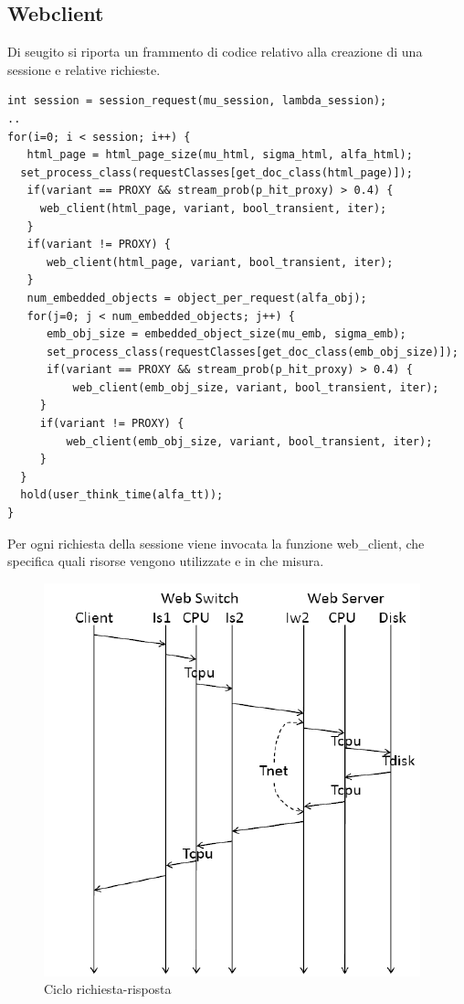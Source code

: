 \subsection{Webclient}
Di seugito si riporta un frammento di codice relativo alla creazione di una sessione e relative richieste. 
\begin{lstlisting}
int session = session_request(mu_session, lambda_session); 
..
for(i=0; i < session; i++) { 
   html_page = html_page_size(mu_html, sigma_html, alfa_html); 
  set_process_class(requestClasses[get_doc_class(html_page)]); 
   if(variant == PROXY && stream_prob(p_hit_proxy) > 0.4) { 
     web_client(html_page, variant, bool_transient, iter); 
   } 
   if(variant != PROXY) { 
      web_client(html_page, variant, bool_transient, iter); 
   } 
   num_embedded_objects = object_per_request(alfa_obj); 
   for(j=0; j < num_embedded_objects; j++) { 
      emb_obj_size = embedded_object_size(mu_emb, sigma_emb); 
      set_process_class(requestClasses[get_doc_class(emb_obj_size)]); 
      if(variant == PROXY && stream_prob(p_hit_proxy) > 0.4) { 
          web_client(emb_obj_size, variant, bool_transient, iter); 
     } 
     if(variant != PROXY) { 
         web_client(emb_obj_size, variant, bool_transient, iter); 
     } 
  } 
  hold(user_think_time(alfa_tt));
}
\end{lstlisting}
Per ogni richiesta della sessione viene invocata la funzione web\_client, che specifica quali risorse vengono utilizzate e in che misura. 
\begin{figure}[H]
\begin{center}
\includegraphics[scale=0.62]{etc/webclient.png}
\caption{Ciclo richiesta-risposta}
\label{webclient}
\end{center}
\end{figure}
